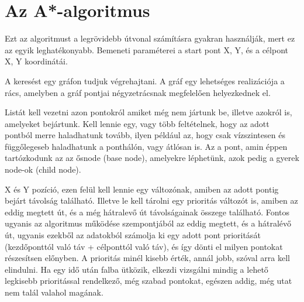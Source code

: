 

\section{Az A*-algoritmus}


Ezt az algoritmust a legrövidebb útvonal számításra gyakran használják, mert ez az egyik leghatékonyabb. Bemeneti paraméterei a start pont X, Y, és a célpont X, Y koordinátái. 

A keresést egy gráfon tudjuk végrehajtani. A gráf egy lehetséges realizációja a rács, amelyben a gráf pontjai négyzetrácsnak megfelelően helyezkednek el.


Listát kell vezetni azon pontokról amiket még nem jártunk be, illetve azokról is, amelyeket bejártunk. Kell lennie egy, vagy több feltételnek, hogy az adott pontból merre haladhatunk tovább, ilyen például az, hogy csak vízszintesen és függőlegeseb haladhatunk a ponthálón, vagy átlósan is. Az a pont, amin éppen tartózkodunk az az ősnode (base node), amelyekre léphetünk, azok pedig a gyerek node-ok (child node).

X és Y pozíció, ezen felül kell lennie egy változónak, amiben az adott pontig bejárt távolság található. Illetve le kell tárolni egy prioritás változót is, amiben az eddig megtett út, és a még hátralevő út távolságainak összege található.
Fontos ugyanis az algoritmus működése szempontjából az eddig megtett, és a hátralévő út, ugyanis ezekből az adatokból számolja ki egy adott pont prioritását (kezdőponttól való táv + célponttól való táv), és így dönti el milyen pontokat részesítsen előnyben. A prioritás minél kisebb érték, annál jobb, szóval arra kell elindulni. Ha egy idő után falba ütközik, elkezdi vizsgálni mindig a lehető legkisebb prioritással rendelkező, még szabad pontokat, egészen addig, még utat nem talál valahol magának.



